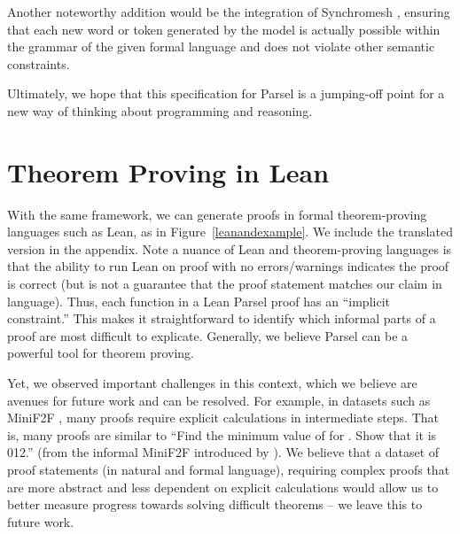 Another noteworthy addition would be the integration of Synchromesh \citep{poesia2022synchromesh}, ensuring that each new word or token generated by the model is actually possible within the grammar of the given formal language and does not violate other semantic constraints.

Ultimately, we hope that this specification for Parsel is a jumping-off point for a new way of thinking about programming and reasoning.

\section{Theorem Proving in Lean}
\label{theoremproving}
With the same framework, we can generate proofs in formal theorem-proving languages such as Lean, as in Figure~\ref{leanandexample}.
We include the translated version in the appendix. Note a nuance of Lean and theorem-proving languages is that the ability to run Lean on proof with no errors/warnings indicates the proof is correct (but is not a guarantee that the proof statement matches our claim in language). Thus, each function in a Lean Parsel proof has an ``implicit constraint.'' This makes it straightforward to identify which informal parts of a proof are most difficult to explicate. Generally, we believe Parsel can be a powerful tool for theorem proving.

Yet, we observed important challenges in this context, which we believe are avenues for future work and can be resolved.
For example, in datasets such as MiniF2F \citep{zheng2021minif2f}, many proofs require explicit calculations in intermediate steps. That is, many proofs are similar to ``Find the minimum value of  for . Show that it is 012.'' (from the informal MiniF2F introduced by \citet{jiang2022draft}). 
We believe that a dataset of proof statements (in natural and formal language), requiring complex proofs that are more abstract and less dependent on explicit calculations would allow us to better measure progress towards solving difficult theorems -- we leave this to future work.

